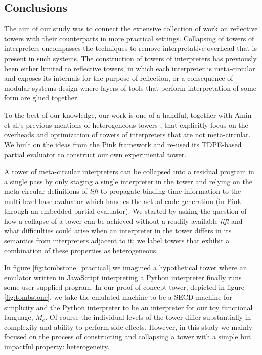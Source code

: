 \documentclass[a4paper,12pt,twoside,openright]{report}
\theoremstyle{definition}
\newcommand{\mevl}{$M_{e}$}
\begin{document}
\subsection{Conclusions}
The aim of our study was to connect the extensive collection of work on reflective towers with their counterparts in more practical settings. Collapsing of towers of interpreters encompasses the techniques to remove interpretative overhead that is present in such systems. The construction of towers of interpreters has previously been either limited to reflective towers, in which each interpreter is meta-circular and exposes its internals for the purpose of reflection, or a consequence of modular systems design where layers of tools that perform interpretation of some form are glued together.

To the best of our knowledge, our work is one of a handful, together with Amin et al.'s previous mentions of heterogeneous towers \cite{amin2017collapsing}, that explicitly focus on the overheads and optimization of towers of interpreters that are not meta-circular. We built on the ideas from the Pink framework and re-used its TDPE-based partial evaluator to construct our own experimental tower.

A tower of meta-circular interpreters can be collapsed into a residual program in a single pass by only staging a single interpreter in the tower and relying on the meta-circular definitions of \textit{lift} to propagate binding-time information to the multi-level base evaluator which handles the actual code generation (in Pink through an embedded partial evaluator). We started by asking the question of how a collapse of a tower can be achieved without a readily available \textit{lift} and what difficulties could arise when an interpreter in the tower differs in its semantics from interpreters adjacent to it; we label towers that exhibit a combination of these properties as heterogeneous.

In figure \ref{fig:tombstone_practical} we imagined a hypothetical tower where an emulator written in JavaScript interpreting a Python interpreter finally runs some user-supplied program. In our proof-of-concept tower, depicted in figure \ref{fig:tombstone}, we take the emulated machine to be a SECD machine for simplicity and the Python interpreter to be an interpreter for our toy functional language, \mevl. Of course the individual levels of the tower differ substantially in complexity and ability to perform side-effects. However, in this study we mainly focused on the process of constructing and collapsing a tower with a simple but impactful property: heterogeneity.
\end{document}

